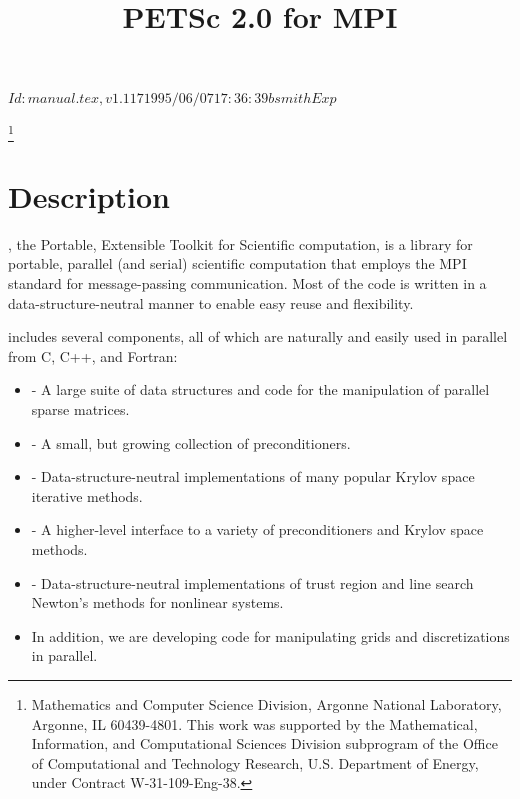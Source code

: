  $Id: manual.tex,v 1.117 1995/06/07 17:36:39 bsmith Exp $ 
\pagestyle{empty}

\pagestyle{empty}
\title{PETSc 2.0 for MPI}
\thanks{Mathematics and Computer Science Division,
Argonne National Laboratory,
Argonne, IL 60439-4801.
This work was supported by the Mathematical,
        Information, and Computational Sciences Division subprogram of
        the Office of Computational and Technology Research,
        U.S. Department of Energy, under Contract W-31-109-Eng-38.}

\date{}
\maketitle

\section*{Description}

, the Portable, Extensible Toolkit for Scientific computation,
is a library for portable, parallel (and serial)
scientific computation that employs the MPI standard for
message-passing communication.  Most of the code is written in a
data-structure-neutral manner to enable easy reuse and flexibility.

 includes several components, all of which
are naturally and easily used in parallel from C, C++, and Fortran:

\vspace{-.4cm}

\begin{itemize}
\item {} - A large suite of data structures and code
      for the manipulation of parallel sparse matrices.
\item {} - A small, but growing collection of preconditioners.
\item {} - Data-structure-neutral implementations of
      many popular Krylov space iterative methods.
\item {} - A higher-level interface to a variety
      of preconditioners and Krylov space methods.
\item {} - Data-structure-neutral 
      implementations of trust region and line search Newton's 
      methods for nonlinear systems. 
\item In addition, we are developing code for manipulating grids
      and discretizations in parallel.
\end{itemize}


